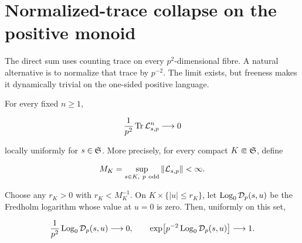 \section{Normalized-trace collapse on the positive monoid}
\label{sec:normalized}

The direct sum uses counting trace on every \(p^2\)-dimensional fibre.  A
natural alternative is to normalize that trace by \(p^{-2}\).  The limit
exists, but freeness makes it dynamically trivial on the one-sided positive
language.

\begin{theorem}
\label{thm:normalized-collapse}
For every fixed \(n\ge1\),

\begin{equation}
 \frac1{p^2}\operatorname{Tr}\mathcal L_{s,p}^n\longrightarrow0
 \label{eq:moment-collapse}
\end{equation}

locally uniformly for \(s\in\mathfrak S\).  More precisely, for every compact
\(K\Subset\mathfrak S\), define

\begin{equation}
 M_K=\sup_{s\in K,\ p\ \odd}\Norm{\cL_{s,p}}<\infty.
 \label{eq:MK}
\end{equation}

Choose any \(r_K>0\) with \(r_K<M_K^{-1}\).  On
\(K\times\{|u|\le r_K\}\), let \(\operatorname{Log}_0\mathcal D_p(s,u)\) be the Fredholm
logarithm whose value at \(u=0\) is zero.  Then, uniformly on this set,

\begin{equation}
 \frac1{p^2}\operatorname{Log}_0\mathcal D_p(s,u)\longrightarrow0,
 \qquad
 \exp\!\left[p^{-2}\operatorname{Log}_0\mathcal D_p(s,u)\right]\longrightarrow1.
 \label{eq:det-collapse}
\end{equation}
\end{theorem}

